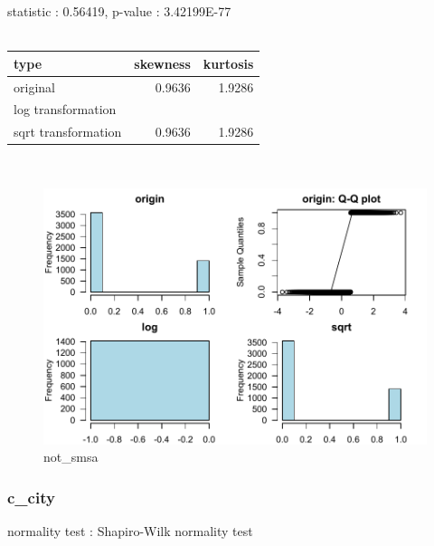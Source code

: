 \documentclass{book}\usepackage[]{graphicx}\usepackage[]{color}
\begin{document}
\noindent statistic : 0.56419,  p-value : 3.42199E-77\\
\\%
\begin{tabular}{lrr}
  \toprule
type & skewness & kurtosis \\ 
  \midrule
original & 0.9636 & 1.9286 \\ 
  log transformation &  &  \\ 
  sqrt transformation & 0.9636 & 1.9286 \\ 
   \bottomrule
\end{tabular}
\\
\begin{figure}[!ht]
\centering
\includegraphics[width=1.0\textwidth]{figure/norm10.pdf}
\caption{not\_smsa}
\end{figure}
\clearpage
\subsubsection{ c\_city }

normality test : Shapiro-Wilk normality test
\end{document}
